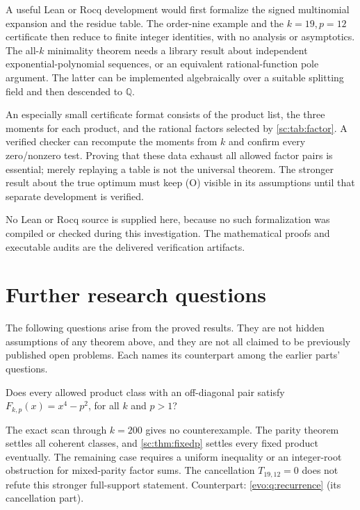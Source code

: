 \documentclass[11pt,a4paper]{article}
\numberwithin{equation}{section}
\theoremstyle{definition}
\theoremstyle{remark}
\begin{document}
A useful Lean or Rocq development would first formalize the signed
multinomial expansion and the residue table. The order-nine example and
the $k=19,p=12$ certificate then reduce to finite integer identities,
with no analysis or asymptotics. The all-$k$ minimality theorem needs a
library result about independent exponential-polynomial sequences, or an
equivalent rational-function pole argument. The latter can be implemented
algebraically over a suitable splitting field and then descended to
$\mathbb Q$.

An especially small certificate format consists of the product list,
the three moments for each product, and the rational factors selected by
\cref{sc:tab:factor}. A verified checker can recompute the moments from $k$
and confirm every zero/nonzero test. Proving that these data exhaust all
allowed factor pairs is essential; merely replaying a table is not the
universal theorem. The stronger result about the true optimum must keep
(O) visible in its assumptions until that separate development is verified.

No Lean or Rocq source is supplied here, because no such formalization
was compiled or checked during this investigation. The mathematical proofs
and executable audits are the delivered verification artifacts.

\section{Further research questions}\label{sc:sec:questions}

The following questions arise from the proved results. They are not hidden
assumptions of any theorem above, and they are not all claimed to be
previously published open problems. Each names its counterpart among the
earlier parts' questions.

\begin{question}\label{sc:q:fullsector}
Does every allowed product class with an off-diagonal pair satisfy
$F_{k,p}(x)=x^4-p^2$, for all $k$ and $p>1$?
\end{question}
The exact scan through $k=200$ gives no counterexample. The parity theorem
settles all coherent classes, and \cref{sc:thm:fixedp} settles every fixed
product eventually. The remaining case requires a uniform inequality or
an integer-root obstruction for mixed-parity factor sums. The cancellation
$T_{19,12}=0$ does not refute this stronger full-support statement.
Counterpart: \cref{evo:q:recurrence} (its cancellation part).
\end{document}
